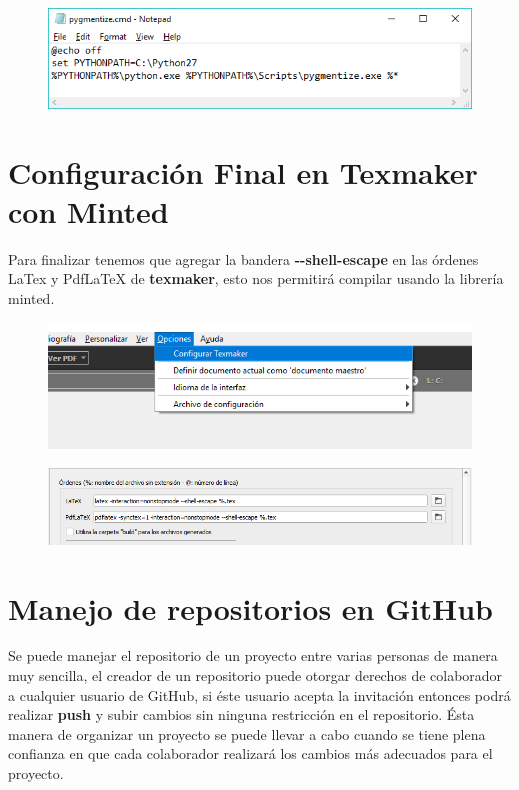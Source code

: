 \documentclass{article}
\begin{document}
\begin{figure}[h!]
  \centering
  \includegraphics[scale=0.75]{./imagenes/Configurar_path16.png}
\end{figure}
\clearpage

\section{Configuración Final en Texmaker con Minted}%

Para finalizar tenemos que agregar la bandera \textbf{{-}{-}shell-escape}
en las órdenes LaTex y PdfLaTeX de \textbf{texmaker}, esto nos permitirá
compilar usando la librería minted.

\begin{figure}[h!]
  \centering
  \includegraphics[scale=0.75]{./imagenes/Configurar_path17.png}
\end{figure}

\begin{figure}[h!]
  \centering
  \includegraphics[scale=0.75]{./imagenes/Configurar_path18.png}
\end{figure}

\section{Manejo de repositorios en GitHub}%
Se puede manejar el repositorio de un proyecto entre varias personas de manera
muy sencilla, el creador de un repositorio puede otorgar derechos de
colaborador a cualquier usuario de GitHub, si éste usuario acepta la invitación
entonces podrá realizar \textbf{push} y subir cambios sin ninguna
restricción en el repositorio. Ésta manera de organizar un proyecto se puede
llevar a cabo cuando se tiene plena confianza en que cada colaborador realizará
los cambios más adecuados para el proyecto.\\
\end{document}
